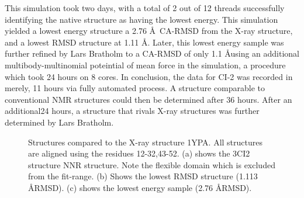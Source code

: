 This simulation took two days, with a total of 2 out of 12 threads successfully identifying the native structure as having the lowest energy.
This simulation yielded a lowest energy structure a 2.76 \AA~CA-RMSD from the X-ray structure, and a lowest RMSD structure at 1.11 \AA. Later, this lowest energy sample was further refined by Lars Bratholm to a CA-RMSD of only 1.1 \AA using an additional multibody-multinomial poteintial of mean force in the simulation\cite{mumu}, a procedure which took 24 hours on 8 cores.
In conclusion, the data for CI-2 was recorded in merely, 11 hours via fully automated process. A structure comparable to conventional NMR structures could then be determined after 36 hours. After an additional24 hours, a structure that rivals X-ray structures was further determined by Lars Bratholm.

\begin{figure}%
    \centering
    \caption{Structures compared to the X-ray structure 1YPA. All structures are aligned using the residues 12-32,43-52. (a) shows the 3CI2 structure NNR structure. Note the flexible domain which is excluded from the fit-range. (b) Shows the lowest RMSD structure (1.113 \AA RMSD). (c) shows the lowest energy sample (2.76 \AA RMSD). }
    \label{fig:ci2}%
\end{figure}



